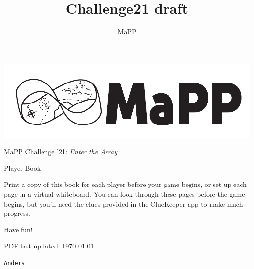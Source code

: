 \documentclass{article}
\title{Challenge21 draft}
\author{MaPP}
\newcommand{\puzzleTitle}[1]{
\begin{center}
{\Large \texttt{#1}}
\end{center}
}
\begin{document}

\thispagestyle{empty}
\begin{center}
\includegraphics[width=0.8\linewidth]{banner_bw}

\Large MaPP Challenge '21: \textit{Enter the Array}

Player Book
\end{center}

\vspace{1in}

\noindent
Print a copy of this book for each
player before your game begins, or set up
each page in a virtual whiteboard.
You can look through these pages before the game begins,
but you'll need the clues provided in the ClueKeeper app
to make much progress.

\vspace{1em}

\noindent
Have fun!

\vfill

{\footnotesize PDF last updated: \today}

\newpage

\puzzleTitle{Anders}

\vfill
\end{document}
